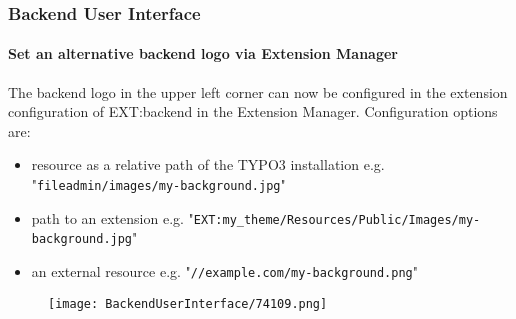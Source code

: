 \begin{frame}[fragile]
	\frametitle{Backend User Interface}
	\framesubtitle{Set an alternative backend logo via Extension Manager}

	The backend logo in the upper left corner can now be configured in the extension configuration
	of EXT:backend in the Extension Manager.\newline
	Configuration options are:

	\begin{itemize}
		\item resource as a relative path of the TYPO3 installation\newline
			\smaller
				e.g. "\texttt{fileadmin/images/my-background.jpg}"
			\normalsize

		\item path to an extension\newline
			\smaller
				e.g. "\texttt{EXT:my\_theme/Resources/Public/Images/my-background.jpg}"
			\normalsize

		\item an external resource\newline
			\smaller
				e.g. "\texttt{//example.com/my-background.png}"
			\normalsize

	\end{itemize}

	\begin{figure}
		\texttt{[image: BackendUserInterface/74109.png]}
	\end{figure}

\end{frame}

